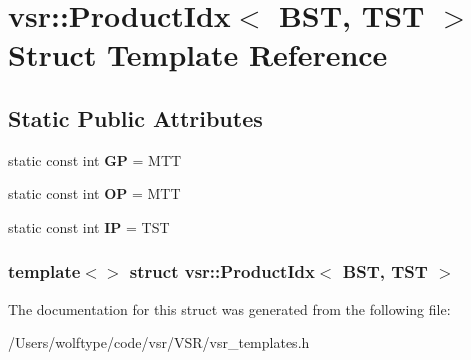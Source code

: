 \hypertarget{structvsr_1_1_product_idx_3_01_b_s_t_00_01_t_s_t_01_4}{\section{vsr\-:\-:Product\-Idx$<$ B\-S\-T, T\-S\-T $>$ Struct Template Reference}
\label{structvsr_1_1_product_idx_3_01_b_s_t_00_01_t_s_t_01_4}
}
\subsection*{Static Public Attributes}
\begin{DoxyCompactItemize}
\item 
\hypertarget{structvsr_1_1_product_idx_3_01_b_s_t_00_01_t_s_t_01_4_a0180fbedbb63edc060ba4f22cca6f5df}{static const int {\bfseries G\-P} = M\-T\-T}\label{structvsr_1_1_product_idx_3_01_b_s_t_00_01_t_s_t_01_4_a0180fbedbb63edc060ba4f22cca6f5df}

\item 
\hypertarget{structvsr_1_1_product_idx_3_01_b_s_t_00_01_t_s_t_01_4_a69ad946bf5a21cbc947d8db83bd038a2}{static const int {\bfseries O\-P} = M\-T\-T}\label{structvsr_1_1_product_idx_3_01_b_s_t_00_01_t_s_t_01_4_a69ad946bf5a21cbc947d8db83bd038a2}

\item 
\hypertarget{structvsr_1_1_product_idx_3_01_b_s_t_00_01_t_s_t_01_4_a20f9bcdc04cc15562c873849101566a6}{static const int {\bfseries I\-P} = T\-S\-T}\label{structvsr_1_1_product_idx_3_01_b_s_t_00_01_t_s_t_01_4_a20f9bcdc04cc15562c873849101566a6}

\end{DoxyCompactItemize}
\subsubsection*{template$<$$>$ struct vsr\-::\-Product\-Idx$<$ B\-S\-T, T\-S\-T $>$}



The documentation for this struct was generated from the following file\-:\begin{DoxyCompactItemize}
\item 
/\-Users/wolftype/code/vsr/\-V\-S\-R/vsr\-\_\-templates.\-h\end{DoxyCompactItemize}
